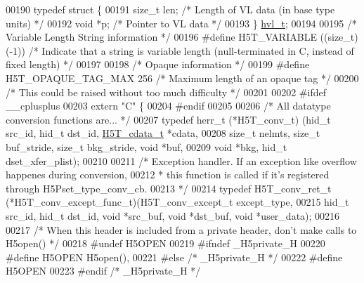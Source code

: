 \begin{DoxyCode}
00190 \textcolor{keyword}{typedef} \textcolor{keyword}{struct }\{
00191     \textcolor{keywordtype}{size\_t} len; \textcolor{comment}{/* Length of VL data (in base type units) */}
00192     \textcolor{keywordtype}{void} *p;    \textcolor{comment}{/* Pointer to VL data */}
00193 \} \hyperlink{structhvl__t}{hvl\_t};
00194 
00195 \textcolor{comment}{/* Variable Length String information */}
00196 \textcolor{preprocessor}{#define H5T\_VARIABLE    ((size\_t)(-1))  }\textcolor{comment}{/* Indicate that a string is variable length (null-terminated in C,
       instead of fixed length) */}\textcolor{preprocessor}{}
00197 
00198 \textcolor{comment}{/* Opaque information */}
00199 \textcolor{preprocessor}{#define H5T\_OPAQUE\_TAG\_MAX      256     }\textcolor{comment}{/* Maximum length of an opaque tag */}\textcolor{preprocessor}{}
00200                                         \textcolor{comment}{/* This could be raised without too much difficulty */}
00201 
00202 \textcolor{preprocessor}{#ifdef \_\_cplusplus}
00203 \textcolor{keyword}{extern} \textcolor{stringliteral}{"C"} \{
00204 \textcolor{preprocessor}{#endif}
00205 
00206 \textcolor{comment}{/* All datatype conversion functions are... */}
00207 \textcolor{keyword}{typedef} herr\_t (*H5T\_conv\_t) (hid\_t src\_id, hid\_t dst\_id, \hyperlink{struct_h5_t__cdata__t}{H5T\_cdata\_t} *cdata,
00208       \textcolor{keywordtype}{size\_t} nelmts, \textcolor{keywordtype}{size\_t} buf\_stride, \textcolor{keywordtype}{size\_t} bkg\_stride, \textcolor{keywordtype}{void} *buf,
00209       \textcolor{keywordtype}{void} *bkg, hid\_t dset\_xfer\_plist);
00210 
00211 \textcolor{comment}{/* Exception handler.  If an exception like overflow happenes during conversion,}
00212 \textcolor{comment}{ * this function is called if it's registered through H5Pset\_type\_conv\_cb.}
00213 \textcolor{comment}{ */}
00214 \textcolor{keyword}{typedef} H5T\_conv\_ret\_t (*H5T\_conv\_except\_func\_t)(H5T\_conv\_except\_t except\_type,
00215     hid\_t src\_id, hid\_t dst\_id, \textcolor{keywordtype}{void} *src\_buf, \textcolor{keywordtype}{void} *dst\_buf, \textcolor{keywordtype}{void} *user\_data);
00216 
00217 \textcolor{comment}{/* When this header is included from a private header, don't make calls to H5open() */}
00218 \textcolor{preprocessor}{#undef H5OPEN}
00219 \textcolor{preprocessor}{#ifndef \_H5private\_H}
00220 \textcolor{preprocessor}{#define H5OPEN          H5open(),}
00221 \textcolor{preprocessor}{#else   }\textcolor{comment}{/* \_H5private\_H */}\textcolor{preprocessor}{}
00222 \textcolor{preprocessor}{#define H5OPEN}
00223 \textcolor{preprocessor}{#endif  }\textcolor{comment}{/* \_H5private\_H */}\textcolor{preprocessor}{}

\end{DoxyCode}
